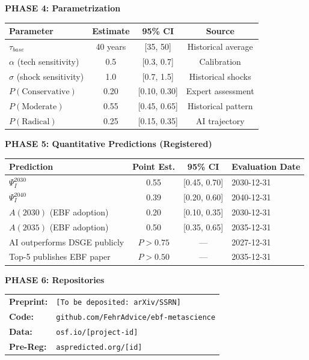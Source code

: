 \begin{tcolorbox}[colback=green!3!white, colframe=green!75!black,
    title=\textbf{EBF WORKFLOW: Applied to This Paper}]
\vspace{0.5em}
\textbf{PHASE 4: Parametrization}

\begin{center}
\small
\begin{tabular}{@{}lccc@{}}
\toprule
\textbf{Parameter} & \textbf{Estimate} & \textbf{95\% CI} & \textbf{Source} \\
\midrule
$\tau_{base}$ & 40 years & [35, 50] & Historical average \\
$\alpha$ (tech sensitivity) & 0.5 & [0.3, 0.7] & Calibration \\
$\sigma$ (shock sensitivity) & 1.0 & [0.7, 1.5] & Historical shocks \\
$P(\text{Conservative})$ & 0.20 & [0.10, 0.30] & Expert assessment \\
$P(\text{Moderate})$ & 0.55 & [0.45, 0.65] & Historical pattern \\
$P(\text{Radical})$ & 0.25 & [0.15, 0.35] & AI trajectory \\
\bottomrule
\end{tabular}
\end{center}

\vspace{0.5em}
\textbf{PHASE 5: Quantitative Predictions (Registered)}

\begin{center}
\small
\begin{tabular}{@{}lccl@{}}
\toprule
\textbf{Prediction} & \textbf{Point Est.} & \textbf{95\% CI} & \textbf{Evaluation Date} \\
\midrule
$\Psi_I^{2030}$ & 0.55 & [0.45, 0.70] & 2030-12-31 \\
$\Psi_I^{2040}$ & 0.39 & [0.20, 0.60] & 2040-12-31 \\
$A(2030)$ (EBF adoption) & 0.20 & [0.10, 0.35] & 2030-12-31 \\
$A(2035)$ (EBF adoption) & 0.50 & [0.35, 0.65] & 2035-12-31 \\
AI outperforms DSGE publicly & $P > 0.75$ & --- & 2027-12-31 \\
Top-5 publishes EBF paper & $P > 0.50$ & --- & 2035-12-31 \\
\bottomrule
\end{tabular}
\end{center}

\vspace{0.5em}
\textbf{PHASE 6: Repositories}

\begin{tabular}{@{}ll@{}}
\textbf{Preprint:} & \texttt{[To be deposited: arXiv/SSRN]} \\
\textbf{Code:} & \texttt{github.com/FehrAdvice/ebf-metascience} \\
\textbf{Data:} & \texttt{osf.io/[project-id]} \\
\textbf{Pre-Reg:} & \texttt{aspredicted.org/[id]} \\
\end{tabular}


\end{tcolorbox}
